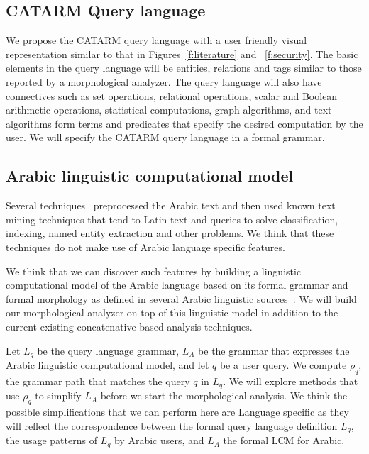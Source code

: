 \documentclass[12pt]{article}
\begin{document}
\subsection{CATARM Query language}
\label{s:design:query}

We propose the CATARM query language with a user friendly
visual representation similar to that in Figures~\ref{f:literature} and
~\ref{f:security}. 
The basic elements in the query language will be entities, relations
and tags similar to those reported by a morphological analyzer. 
The query language will also have connectives such as set operations, 
relational operations, 
scalar and Boolean arithmetic operations, 
statistical computations, graph algorithms, and text algorithms
form terms and predicates that specify the desired computation
by the user. 
We will specify the CATARM query language in a formal grammar.

\subsection{Arabic linguistic computational model }
\label{s:design:lcm}

Several techniques~\cite{AEL07,Ham07,Abd07,MEl03} 
preprocessed the Arabic text and then used known text 
mining techniques that tend to Latin text and queries
to solve classification, indexing, named entity 
extraction and other problems.
We think that these techniques do not make use 
of Arabic language specific features.

We think that we can discover such features by building
a linguistic computational model of the Arabic language
based on its formal grammar and formal morphology
as defined in several Arabic linguistic 
sources~\cite{Sha73,Abd00,Abd001}.
We will build our morphological analyzer on top 
of this linguistic model in addition to the current existing
concatenative-based analysis techniques. 

Let $L_q$ be the query language grammar, 
$L_A$ be the grammar that expresses the Arabic linguistic
computational model, and let $q$ be a user query.
We compute $\rho_q$, the grammar path that matches 
the query $q$ in $L_q$. 
We will explore methods that use $\rho_q$ to simplify 
$L_A$ before we start the morphological analysis. 
We think the possible simplifications that we can perform
here are Language specific as they will reflect the 
correspondence between the formal query language definition $L_q$, 
the usage patterns of $L_q$  by Arabic users, 
and $L_A$ the formal LCM for Arabic. 
\end{document}
